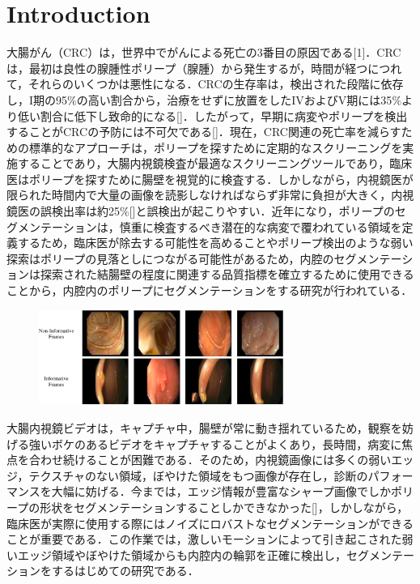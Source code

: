 \documentclass{article}
\begin{document}
\section{Introduction}
\label{sec:intro}
大腸がん（CRC）は，世界中でがんによる死亡の3番目の原因である[1]．CRCは，最初は良性の腺腫性ポリープ（腺腫）から発生するが，時間が経つにつれて，それらのいくつかは悪性になる．CRCの生存率は，検出された段階に依存し，I期の95$\%$の高い割合から，治療をせずに放置をしたIVおよびV期には35$\%$より低い割合に低下し致命的になる[]．したがって，早期に病変やポリープを検出することがCRCの予防には不可欠である[]．現在，CRC関連の死亡率を減らすための標準的なアプローチは，ポリープを探すために定期的なスクリーニングを実施することであり，大腸内視鏡検査が最適なスクリーニングツールであり，臨床医はポリープを探すために腸壁を視覚的に検査する．しかしながら，内視鏡医が限られた時間内で大量の画像を読影しなければならず非常に負担が大きく，内視鏡医の誤検出率は約25$\%$[]と誤検出が起こりやすい．近年になり，ポリープのセグメンテーションは，慎重に検査するべき潜在的な病変で覆われている領域を定義するため，臨床医が除去する可能性を高めることやポリープ検出のような弱い探索はポリープの見落としにつながる可能性があるため，内腔のセグメンテーションは探索された結腸壁の程度に関連する品質指標を確立するために使用できることから，内腔内のポリープにセグメンテーションをする研究が行われている．
\begin{figure}[t]
\begin{center}
\includegraphics[width=80mm]{fig0.eps}
\caption{}
\end{center}
\end{figure}
大腸内視鏡ビデオは，キャプチャ中，腸壁が常に動き揺れているため，観察を妨げる強いボケのあるビデオをキャプチャすることがよくあり，長時間，病変に焦点を合わせ続けることが困難である．そのため，内視鏡画像には多くの弱いエッジ，テクスチャのない領域，ぼやけた領域をもつ画像が存在し，診断のパフォーマンスを大幅に妨げる．今までは，エッジ情報が豊富なシャープ画像でしかポリープの形状をセグメンテーションすることしかできなかった[]，しかしながら，臨床医が実際に使用する際にはノイズにロバストなセグメンテーションができることが重要である．この作業では，激しいモーションによって引き起こされた弱いエッジ領域やぼやけた領域からも内腔内の輪郭を正確に検出し，セグメンテーションをするはじめての研究である．
\end{document}
